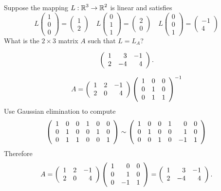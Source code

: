 \documentclass{ximera}
\author{Matthew Carr}
\begin{document}

\begin{exercise}\label{mc8_3A}

Suppose the mapping $L:\mbox{$\mathbb{R}$}^3\to\mbox{$\mathbb{R}$}^2$ is linear and satisfies
\[
L \left(\begin{array}{c} 1 \\ 0 \\0 \end{array}\right) = \left(\begin{array}{c} 1 \\ 2  \end{array}\right) \quad
L \left(\begin{array}{c} 0 \\ 1\\ 1 \end{array}\right) = \left(\begin{array}{c} 2 \\ 0 \end{array}\right) \quad
L\left(\begin{array}{c} 0 \\ 0 \\ 1 \end{array}\right) = \left(\begin{array}{r} -1 \\ 4 \end{array}\right)
\]
What is the  $2\times 3$ matrix $A$ such that $L = L_A$?
  
\begin{solution}

\ans \[\left(\begin{array}{rrrrrrrrrrrrrrrrrr} 1 & 3 & -1\\ 2 & -4 & 4 \end{array}\right)\ldotp\]

\soln \[
A = \left(\begin{array}{rrrrrrrrrrrrrrrrrr} 1 & 2 & -1\\ 2 & 0 & 4 \end{array}\right) \left(\begin{array}{rrrrrrrrrrrrrrrrrr} 1 & 0 & 0 \\ 0 & 1 & 0 \\ 0 & 1 & 1 \end{array}\right)^{-1}
\]
Use Gaussian elimination to compute 
\[
\left(\begin{array}{rrrrrrrrrrrrrrrrrr} 1 & 0 & 0 & 1 & 0 & 0\\ 0 & 1 & 0 & 0 & 1 & 0\\ 0 & 1 & 1 & 0 & 0 & 1 \end{array}\right)\sim
\left(\begin{array}{rrrrrrrrrrrrrrrrrr} 1 & 0 & 0 & 1 & 0 & 0\\ 0 & 1 & 0 & 0 & 1 & 0\\ 0 & 0 & 1 & 0 & -1 & 1 \end{array}\right)
\]
Therefore
\[
A = \left(\begin{array}{rrrrrrrrrrrrrrrrrr} 1 & 2 & -1\\ 2 & 0 & 4 \end{array}\right) \left(\begin{array}{rrrrrrrrrrrrrrrrrr}  1 & 0 & 0\\   0 & 1 & 0\\  0 & -1 & 1 \end{array}\right) = 
 \left(\begin{array}{rrrrrrrrrrrrrrrrrr} 1 & 3 & -1\\ 2 & -4 & 4 \end{array}\right)\ldotp
\]
\end{solution}
\end{exercise}
\end{document}
